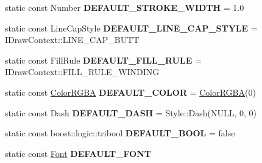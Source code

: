\begin{DoxyCompactItemize}
\item 
\hypertarget{classsambag_1_1disco_1_1graphic_elements_1_1_style_a8ea45eadc4a8d55dd0d9e5fa614eb44c}{
static const Number {\bfseries DEFAULT\_\-STROKE\_\-WIDTH} = 1.0}
\label{classsambag_1_1disco_1_1graphic_elements_1_1_style_a8ea45eadc4a8d55dd0d9e5fa614eb44c}

\item 
\hypertarget{classsambag_1_1disco_1_1graphic_elements_1_1_style_a8cf9cfff7f010396fddae57ff1468e7a}{
static const LineCapStyle {\bfseries DEFAULT\_\-LINE\_\-CAP\_\-STYLE} = IDrawContext::LINE\_\-CAP\_\-BUTT}
\label{classsambag_1_1disco_1_1graphic_elements_1_1_style_a8cf9cfff7f010396fddae57ff1468e7a}

\item 
\hypertarget{classsambag_1_1disco_1_1graphic_elements_1_1_style_a25292f5a024b64fc0b3746516984f5c0}{
static const FillRule {\bfseries DEFAULT\_\-FILL\_\-RULE} = IDrawContext::FILL\_\-RULE\_\-WINDING}
\label{classsambag_1_1disco_1_1graphic_elements_1_1_style_a25292f5a024b64fc0b3746516984f5c0}

\item 
\hypertarget{classsambag_1_1disco_1_1graphic_elements_1_1_style_a56d6ed87bb40d65515dbe623ad1190d4}{
static const \hyperlink{structsambag_1_1com_1_1_color_r_g_b_a}{ColorRGBA} {\bfseries DEFAULT\_\-COLOR} = \hyperlink{structsambag_1_1com_1_1_color_r_g_b_a}{ColorRGBA}(0)}
\label{classsambag_1_1disco_1_1graphic_elements_1_1_style_a56d6ed87bb40d65515dbe623ad1190d4}

\item 
\hypertarget{classsambag_1_1disco_1_1graphic_elements_1_1_style_afe6fee56ac1e422a3a2583689c48512e}{
static const Dash {\bfseries DEFAULT\_\-DASH} = Style::Dash(NULL, 0, 0)}
\label{classsambag_1_1disco_1_1graphic_elements_1_1_style_afe6fee56ac1e422a3a2583689c48512e}

\item 
\hypertarget{classsambag_1_1disco_1_1graphic_elements_1_1_style_a4eb77015cbcc562d957a8929d3d2247c}{
static const boost::logic::tribool {\bfseries DEFAULT\_\-BOOL} = false}
\label{classsambag_1_1disco_1_1graphic_elements_1_1_style_a4eb77015cbcc562d957a8929d3d2247c}

\item 
\hypertarget{classsambag_1_1disco_1_1graphic_elements_1_1_style_a3e9930e86d05a6794164019d6b463bde}{
static const \hyperlink{structsambag_1_1disco_1_1_font}{Font} {\bfseries DEFAULT\_\-FONT}}
\label{classsambag_1_1disco_1_1graphic_elements_1_1_style_a3e9930e86d05a6794164019d6b463bde}

\end{DoxyCompactItemize}


